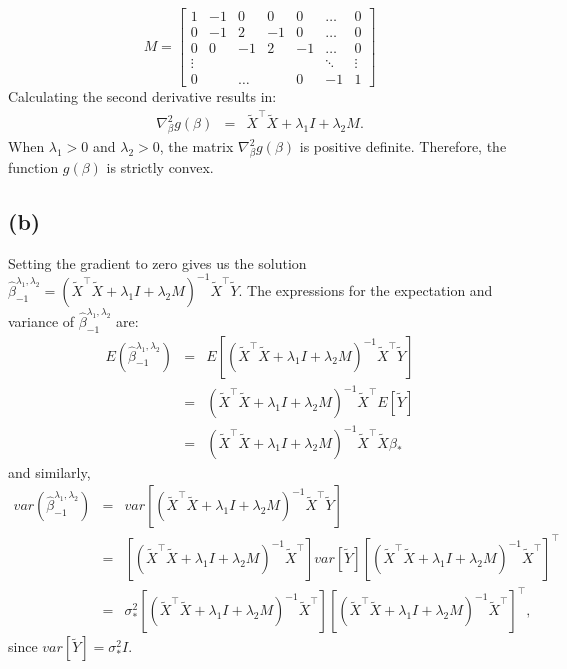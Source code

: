 \documentclass{article}\usepackage[]{graphicx}\usepackage[]{color}
\begin{document}
\[
M
=
\begin{bmatrix}
    1 & -1 & 0 & 0 & 0 & \dots & 0 \\
    0 & -1 & 2 & -1 & 0 & \dots  & 0 \\
    0 & 0 & -1 & 2 & -1 & \dots & 0 \\
    \vdots &  &  &  &  & \ddots & \vdots \\
    0 & & \dots &  & 0 & -1  & 1
\end{bmatrix}
\]
Calculating the second derivative results in:
\begin{eqnarray*}
  \nabla^2_\beta g(\beta) &=& \tilde{X}^\top\tilde{X} + \lambda_1 I + \lambda_2 M.
\end{eqnarray*}
When $\lambda_1>0$ and $\lambda_2>0$, the matrix $\nabla^2_\beta g(\beta)$ is positive definite.  Therefore, the function $g(\beta)$ is strictly convex.

\subsection*{(b)}
Setting the gradient to zero gives us the solution $\hat{\beta}^{\lambda_1,\lambda_2}_{-1}=(\tilde{X}^\top\tilde{X} + \lambda_1 I + \lambda_2 M)^{-1} \tilde{X}^\top\tilde{Y}$. The expressions for the expectation and variance of $\hat{\beta}^{\lambda_1,\lambda_2}_{-1}$ are:
\begin{eqnarray*}
  E(\hat{\beta}^{\lambda_1,\lambda_2}_{-1}) &=& E\left[ (\tilde{X}^\top\tilde{X} + \lambda_1 I + \lambda_2 M)^{-1} \tilde{X}^\top\tilde{Y} \right] \\
  &=& (\tilde{X}^\top\tilde{X} + \lambda_1 I + \lambda_2 M)^{-1}\tilde{X}^\top E[\tilde{Y}] \\
  &=& (\tilde{X}^\top\tilde{X} + \lambda_1 I + \lambda_2 M)^{-1}\tilde{X}^\top\tilde{X}\beta_*
\end{eqnarray*}
and similarly,
\begin{eqnarray*}
  var(\hat{\beta}^{\lambda_1,\lambda_2}_{-1}) &=& var\left[ (\tilde{X}^\top\tilde{X} + \lambda_1 I + \lambda_2 M)^{-1} \tilde{X}^\top\tilde{Y} \right] \\
  &=& \left[ (\tilde{X}^\top\tilde{X} + \lambda_1 I + \lambda_2 M)^{-1} \tilde{X}^\top \right] var[\tilde{Y}] \left[ (\tilde{X}^\top\tilde{X} + \lambda_1 I + \lambda_2 M)^{-1} \tilde{X}^\top \right]^\top \\
  &=& \sigma^2_* \left[ (\tilde{X}^\top\tilde{X} + \lambda_1 I + \lambda_2 M)^{-1} \tilde{X}^\top \right]  \left[ (\tilde{X}^\top\tilde{X} + \lambda_1 I + \lambda_2 M)^{-1} \tilde{X}^\top \right]^\top,
\end{eqnarray*}
since $var[\tilde{Y}]=\sigma^2_* I$.
\end{document}
